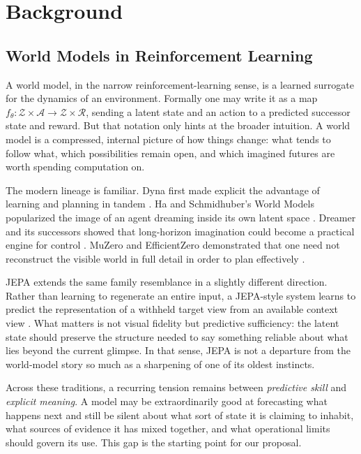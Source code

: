 \documentclass[12pt, a4paper]{article}
\begin{document}
\section{Background}
\label{sec:background}

\subsection{World Models in Reinforcement Learning}

A world model, in the narrow reinforcement-learning sense, is a learned
surrogate for the dynamics of an environment. Formally one may write it as a
map $f_\theta : \mathcal{Z} \times \mathcal{A} \to \mathcal{Z} \times
\mathcal{R}$, sending a latent state and an action to a predicted successor
state and reward. But that notation only hints at the broader intuition. A
world model is a compressed, internal picture of how things change: what tends
to follow what, which possibilities remain open, and which imagined futures are
worth spending computation on.

The modern lineage is familiar. Dyna first made explicit the advantage of
learning and planning in tandem \citep{sutton1990dyna}. Ha and Schmidhuber's
World Models popularized the image of an agent dreaming inside its own latent
space \citep{ha2018world}. Dreamer and its successors showed that long-horizon
imagination could become a practical engine for control
\citep{hafner2019dream, hafner2021mastering, hafner2023mastering}. MuZero and
EfficientZero demonstrated that one need not reconstruct the visible world in
full detail in order to plan effectively \citep{schrittwieser2020mastering,
ye2021efficientzero}.

JEPA extends the same family resemblance in a slightly different direction.
Rather than learning to regenerate an entire input, a JEPA-style system learns
to predict the representation of a withheld target view from an available
context view \citep{lecun2022path, assran2023ijepa}. What matters is not visual
fidelity but predictive sufficiency: the latent state should preserve the
structure needed to say something reliable about what lies beyond the current
glimpse. In that sense, JEPA is not a departure from the world-model story so
much as a sharpening of one of its oldest instincts.

Across these traditions, a recurring tension remains between \emph{predictive
skill} and \emph{explicit meaning}. A model may be extraordinarily good at
forecasting what happens next and still be silent about what sort of state it
is claiming to inhabit, what sources of evidence it has mixed together, and
what operational limits should govern its use. This gap is the starting point
for our proposal.
\end{document}
